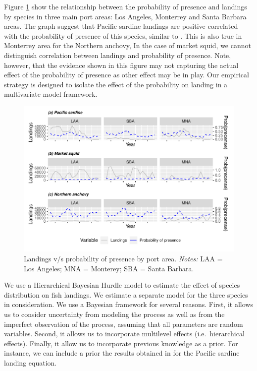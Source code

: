 \documentclass[
]{article}
\begin{document}
Figure \ref{fig:sdm_land_by_port} show the relationship between the
probability of presence and landings by species in three main port
areas: Los Angeles, Monterrey and Santa Barbara areas. The graph suggest
that Pacific sardine landings are positive correlated with the
probability of presence of this species, similar to
\citet{smith2021potential}. This is also true in Monterrey area for the
Northern anchovy, In the case of market squid, we cannot distinguish
correlation between landings and probability of presence. Note, however,
that the evidence shown in this figure may not capturing the actual
effect of the probability of presence as other effect may be in play.
Our empirical strategy is designed to isolate the effect of the
probability on landing in a multivariate model framework.

\begin{figure}
\centering
\includegraphics{econ_landings_paper_files/figure-latex/SDM_land_by_port-1.pdf}
\caption{Landings v/s probability of presence by port area.
\textit{Notes:} LAA = Los Angeles; MNA = Monterey; SBA = Santa
Barbara.\label{fig:sdm_land_by_port}}
\end{figure}

We use a Hierarchical Bayesian Hurdle model to estimate the effect of
species distribution on fish landings. We estimate a separate model for
the three species in consideration. We use a Bayesian framework for
several reasons. First, it allows us to consider uncertainty from
modeling the process as well as from the imperfect observation of the
process, assuming that all parameters are random variables. Second, it
allows us to incorporate multilevel effects (i.e.~hierarchical effects).
Finally, it allow us to incorporate previous knowledge as a prior. For
instance, we can include a prior the results obtained in
\citet{smith2021potential} for the Pacific sardine landing equation.
\end{document}
